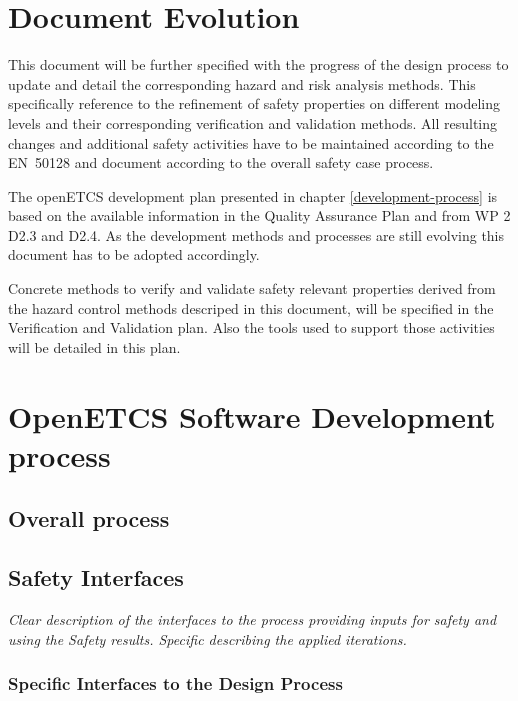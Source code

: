 \documentclass{template/openetcs_report}
\begin{document}

\chapter{Document Evolution}

This document will be further specified with the progress of the design process to update and detail the corresponding hazard and risk analysis methods. This specifically reference to the refinement of safety properties on different modeling levels and their corresponding verification and validation methods. All resulting changes and additional safety activities have to be maintained according to the EN~50128 and document according to the overall safety case process. 

The openETCS development plan presented in chapter \ref{development-process} is based on the available information in the Quality Assurance Plan and from WP 2 D2.3 and D2.4. As the development methods and processes are still evolving this document has to be adopted accordingly.

Concrete methods to verify and validate safety relevant properties derived from the hazard control methods descriped in this document, will be specified in the Verification and Validation plan. Also the tools used to support those activities will be detailed in this plan.

\chapter{OpenETCS Software Development process}



\section{Overall process}

\section{Safety Interfaces}

\textit{Clear description of the interfaces to the process providing inputs for safety and using the Safety results. Specific describing the applied iterations.}

\subsection{Specific Interfaces to the Design Process}
\end{document}
